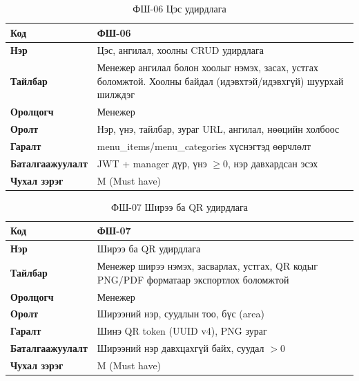 \begin{table}[htbp]
\caption{ФШ-06 Цэс удирдлага}
\label{tab:fr06}
\centering
\small
\begin{tabularx}{\textwidth}{|l|L|}
\hline
{}
\textbf{Код} & ФШ-06 \\ \hline
\textbf{Нэр} & Цэс, ангилал, хоолны CRUD удирдлага \\ \hline
{}
\textbf{Тайлбар} & Менежер ангилал болон хоолыг нэмэх, засах, устгах боломжтой. Хоолны байдал (идэвхтэй/идэвхгүй) шуурхай шилждэг \\ \hline
\textbf{Оролцогч} & Менежер \\ \hline
{}
\textbf{Оролт} & Нэр, үнэ, тайлбар, зураг URL, ангилал, нөөцийн холбоос \\ \hline
\textbf{Гаралт} & menu\_items/menu\_categories хүснэгтэд өөрчлөлт \\ \hline
{}
\textbf{Баталгаажуулалт} & JWT + manager дүр, үнэ $\geq 0$, нэр давхардсан эсэх \\ \hline
\textbf{Чухал зэрэг} & M (Must have) \\ \hline
\end{tabularx}
\end{table}

\begin{table}[htbp]
\caption{ФШ-07 Ширээ ба QR удирдлага}
\label{tab:fr07}
\centering
\small
\begin{tabularx}{\textwidth}{|l|L|}
\hline
{}
\textbf{Код} & ФШ-07 \\ \hline
\textbf{Нэр} & Ширээ ба QR удирдлага \\ \hline
{}
\textbf{Тайлбар} & Менежер ширээ нэмэх, засварлах, устгах, QR кодыг PNG/PDF форматаар экспортлох боломжтой \\ \hline
\textbf{Оролцогч} & Менежер \\ \hline
{}
\textbf{Оролт} & Ширээний нэр, суудлын тоо, бүс (area) \\ \hline
\textbf{Гаралт} & Шинэ QR token (UUID v4), PNG зураг \\ \hline
{}
\textbf{Баталгаажуулалт} & Ширээний нэр давхцахгүй байх, суудал $>0$ \\ \hline
\textbf{Чухал зэрэг} & M (Must have) \\ \hline
\end{tabularx}
\end{table}

